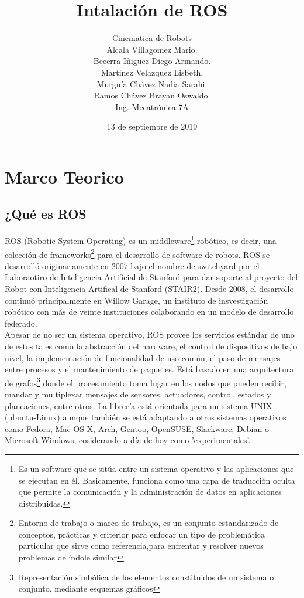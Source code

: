 \documentclass[letter,openrigth,12pt,spanish]{report}
\title{\textbf{Intalaci\'on de ROS}}
\author{Cinematica de Robots\\
		Alcala Villagomez Mario.\\
		Becerra I\~niguez Diego Armando.\\
		Martinez Velazquez Lisbeth.\\
		Murgu\'ia Ch\'avez Nadia Sarahi.\\
		Ramos Ch\'avez Brayan Oswaldo.\\
		Ing. Mecatr\'onica 7A}
\date{13 de septiembre de 2019}
\begin{document}
\maketitle

\section{Marco Teorico}

\subsection{¿Qu\'e es ROS}

ROS (Robotic System Operating) es un middleware\footnote{Es un software que se sit\'ua entre un sistema operativo y las aplicaciones que se ejecutan en \'el. Basicamente, funciona como una capa de traducci\'on oculta que permite la comunicaci\'on y la administraci\'on de datos en aplicaciones distribuidas.} rob\'otico, es decir, una colecci\'on de frameworks\footnote{Entorno de trabajo o marco de trabajo, es un conjunto estandarizado de conceptos, pr\'acticas y criterior para enfocar un tipo de problem\'atica particular que sirve como referencia,para enfrentar y resolver nuevos problemas de \'indole similar} para el desarrollo de software de robots. ROS se desarroll\'o originariamente en 2007 bajo el nombre de switchyard por el Laboraotiro de Inteligencia Artificial de Stanford para dar soporte al proyecto del Robot con Inteligencia Artifical de Stanford (STAIR2). Desde 2008, el desarrollo continu\'o principalmente en Willow Garage, un instituto de insvestigaci\'on rob\'otico con m\'as de veinte instituciones colaborando en un modelo de desarrollo federado.\\

Apesar de no ser un sistema operativo, ROS provee los servicios est\'andar de uno de estos tales como la abstracci\'on del hardware, el control de dispositivos de bajo nivel, la implementaci\'on de funcionalidad de uso com\'un, el paso de mensajes entre procesos y el mantenimiento de paquetes. Est\'a basado en una arquitectura de grafos\footnote{Representaci\'on simb\'olica de los elementos constituidos de un sistema o conjunto, mediante esquemas gr\'aficos} donde el procesamiento toma lugar en los nodos que pueden recibir, mandar y multiplexar mensajes de sensores, actuadores, control, estados y planeaciones, entre otros. La librer\'ia est\'a orientada para un sistema UNIX (ubuntu-Linux) aunque tambi\'en se est\'a adaptando a otros sistemas operativos como Fedora, Mac OS X, Arch, Gentoo, OpenSUSE, Slackware, Debian o Microsoft Windows, cosiderando a d\'ia de hoy como 'experimentales'.\\
\end{document}
